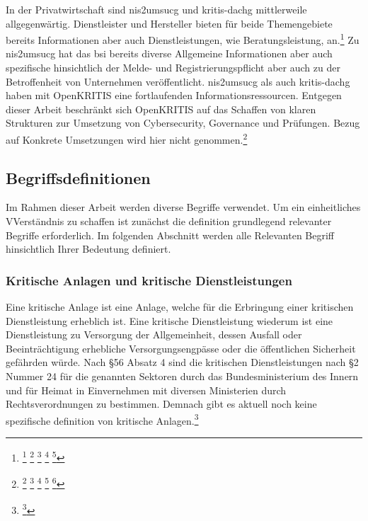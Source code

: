 \documentclass[11pt,a4paper,hidelinks]{article}   %
\begin{document}
        In der Privatwirtschaft sind \gls{nis2umsucg} und \gls{kritis-dachg} mittlerweile allgegenwärtig. Dienstleister und Hersteller bieten für beide Themengebiete bereits Informationen aber auch Dienstleistungen, wie Beratungsleistung, an.\footnote{
            \footcite[Vgl.][]{openkritis:217173}
            \footcite[Vgl.][]{bechtle:8d80e0}
            \footcite[Vgl.][]{ithaus:a13909}
            \footcite[Vgl.][]{schmidalarm:39d493}
            \footcite[Vgl.][]{telenot:5f5056}
        } Zu \gls{nis2umsucg} hat das \gls{bsi} bereits diverse Allgemeine Informationen aber auch spezifische hinsichtlich der Melde- und Registrierungspflicht aber auch zu der Betroffenheit von Unternehmen veröffentlicht. \gls{nis2umsucg} als auch \gls{kritis-dachg} haben mit OpenKRITIS eine fortlaufenden Informationsressourcen. Entgegen dieser Arbeit beschränkt sich OpenKRITIS auf das Schaffen von klaren Strukturen zur Umsetzung von Cybersecurity, Governance und Prüfungen. Bezug auf Konkrete Umsetzungen wird hier nicht genommen.\footnote{
            \footcite[Vgl. ][]{bsi:544680}
            \footcite[Vgl. ][]{bsi:0d23a2}
            \footcite[Vgl. ][]{bsi:ad8980}
            \footcite[Vgl. ][]{bsi:61aa17}
            \footcite[Vgl. ][]{bmi:521cab}
        }
        
        \subsection{Begriffsdefinitionen}
        Im Rahmen dieser Arbeit werden diverse Begriffe verwendet. Um ein einheitliches VVerständnis zu schaffen ist zunächst die definition grundlegend relevanter Begriffe erforderlich. Im folgenden Abschnitt werden alle Relevanten Begriff hinsichtlich Ihrer Bedeutung definiert.
            \subsubsection{Kritische Anlagen und kritische Dienstleistungen}
            Eine kritische Anlage ist eine Anlage, welche für die Erbringung einer kritischen Dienstleistung erheblich ist. Eine kritische Dienstleistung wiederum ist eine Dienstleistung zu Versorgung der Allgemeinheit, dessen Ausfall oder Beeinträchtigung erhebliche Versorgungsengpässe oder die öffentlichen Sicherheit gefährden würde. Nach §56 Absatz 4 sind die kritischen Dienstleistungen nach §2 Nummer 24 für die genannten Sektoren durch das Bundesministerium des Innern und für Heimat in Einvernehmen mit diversen Ministerien durch Rechtsverordnungen zu bestimmen. Demnach gibt es aktuell noch keine spezifische definition von kritische Anlagen.\footnote{
                \footcite[§2 Nummer 22 und 24 sowie §56 Absatz 4][]{NIS2UmsuCG}
            }
\end{document}
